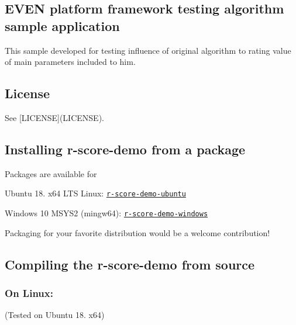 \subsection*{E\+V\+EN platform framework testing algorithm sample application}

This sample developed for testing influence of original algorithm to rating value of main parameters included to him.

\subsection*{License}

See \mbox{[}L\+I\+C\+E\+N\+SE\mbox{]}(L\+I\+C\+E\+N\+SE).

\subsection*{Installing r-\/score-\/demo from a package}

Packages are available for


\begin{DoxyItemize}
\item Ubuntu 18. x64 L\+TS Linux\+: \href{https://evenfound.org/packages/r-score-demo-ubuntu/}{\tt r-\/score-\/demo-\/ubuntu}
\item Windows 10 M\+S\+Y\+S2 (mingw64)\+: \href{https://evenfound.org/packages/r-score-demo-windows/}{\tt r-\/score-\/demo-\/windows}
\end{DoxyItemize}

Packaging for your favorite distribution would be a welcome contribution!

\subsection*{Compiling the r-\/score-\/demo from source}

\subsubsection*{On Linux\+:}

(Tested on Ubuntu 18. x64)


